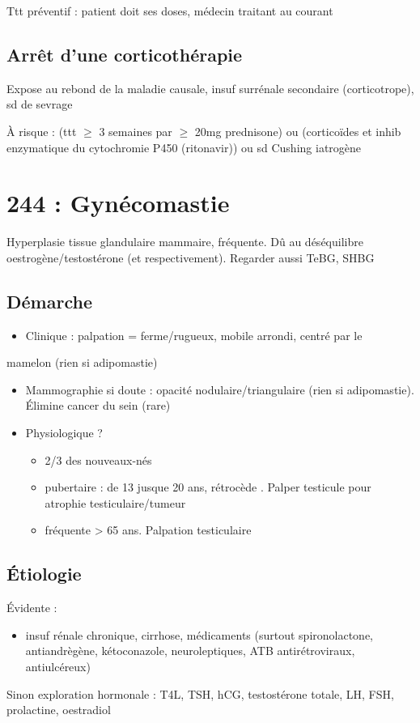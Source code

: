 \documentclass[11pt]{article}
\begin{document}
Ttt préventif : patient doit \inc ses doses, médecin traitant au courant

\subsection{Arrêt d'une corticothérapie}
\label{sec:orgca8e899}
Expose au rebond de la maladie causale, insuf surrénale secondaire
(corticotrope), sd de sevrage

À risque : (ttt \(\ge\) 3 semaines par \(\ge\) 20mg prednisone) ou (corticoïdes et inhib enzymatique du
cytochromie P450 (ritonavir)) ou sd Cushing iatrogène
\section{244 : Gynécomastie}
\label{sec:org556a5f0}
Hyperplasie tissue glandulaire mammaire, fréquente. Dû au déséquilibre
oestrogène/testostérone (\inc et \dec respectivement). Regarder aussi TeBG,
SHBG
\subsection{Démarche}
\label{sec:orgf84b741}
\begin{itemize}
\item Clinique : palpation = ferme/rugueux, mobile arrondi, centré par le
\end{itemize}
mamelon (rien si adipomastie)
\begin{itemize}
\item Mammographie si doute : opacité nodulaire/triangulaire (rien si adipomastie). Élimine cancer du sein (rare)
\item Physiologique ? 
\begin{itemize}
\item 2/3 des nouveaux-nés
\item pubertaire : de 13 jusque 20 ans, rétrocède . Palper testicule pour atrophie testiculaire/tumeur
\item fréquente > 65 ans. Palpation testiculaire
\end{itemize}
\end{itemize}
\subsection{Étiologie}
\label{sec:orgd2338d2}
Évidente :
\begin{itemize}
\item insuf rénale chronique, cirrhose, médicaments (surtout spironolactone,
antiandrègène, kétoconazole, neuroleptiques, ATB antirétroviraux, antiulcéreux)
\end{itemize}
Sinon exploration hormonale : T4L, TSH, hCG, testostérone totale, LH, FSH,
prolactine, oestradiol
\end{document}
